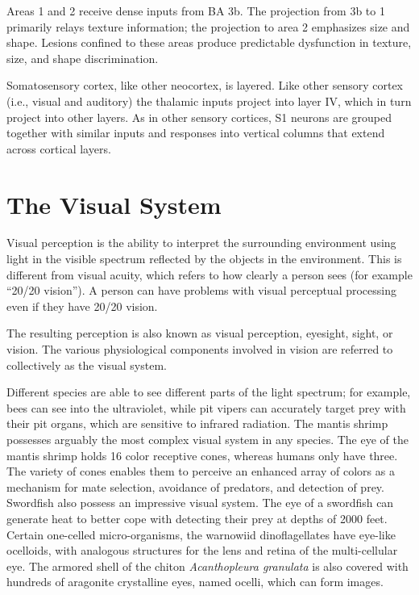 Areas 1 and 2 receive dense inputs from BA 3b. The projection from 3b to 1 primarily relays texture information; the projection to area 2 emphasizes size and shape. Lesions confined to these areas produce predictable dysfunction in texture, size, and shape discrimination.

Somatosensory cortex, like other neocortex, is layered. Like other sensory cortex (i.e., visual and auditory) the thalamic inputs project into layer IV, which in turn project into other layers. As in other sensory cortices, S1 neurons are grouped together with similar inputs and responses into vertical columns that extend across cortical layers.

\hypertarget{the-visual-system}{%
\chapter{The Visual System}\label{the-visual-system}}

Visual perception is the ability to interpret the surrounding environment using light in the visible spectrum reflected by the objects in the environment. This is different from visual acuity, which refers to how clearly a person sees (for example ``20/20 vision''). A person can have problems with visual perceptual processing even if they have 20/20 vision.

The resulting perception is also known as visual perception, eyesight, sight, or vision. The various physiological components involved in vision are referred to collectively as the visual system.

Different species are able to see different parts of the light spectrum; for example, bees can see into the ultraviolet, while pit vipers can accurately target prey with their pit organs, which are sensitive to infrared radiation. The mantis shrimp possesses arguably the most complex visual system in any species. The eye of the mantis shrimp holds 16 color receptive cones, whereas humans only have three. The variety of cones enables them to perceive an enhanced array of colors as a mechanism for mate selection, avoidance of predators, and detection of prey. Swordfish also possess an impressive visual system. The eye of a swordfish can generate heat to better cope with detecting their prey at depths of 2000 feet. Certain one-celled micro-organisms, the warnowiid dinoflagellates have eye-like ocelloids, with analogous structures for the lens and retina of the multi-cellular eye. The armored shell of the chiton \emph{Acanthopleura granulata} is also covered with hundreds of aragonite crystalline eyes, named ocelli, which can form images.

